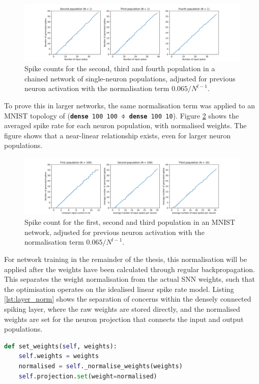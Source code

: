 \begin{figure}
  \includegraphics[width=\linewidth]{images/spike_rate_chain.png}
  \caption{Spike counts for the second, third and fourth population in a chained network of
  single-neuron populations, adjusted for previous neuron activation with the
  normalisation term $0.065 / N^{l - 1}$.}
  \label{fig:spike_rates_chain}
\end{figure}

To prove this in larger networks, the same normalisation term was applied to an MNIST
topology of (\texttt{\textbf{dense} 100 100 $\obar$ \textbf{dense} 100 10}).
Figure \ref{fig:spike_rates_mnist} shows the averaged spike rate for each neuron
population, with normalised weights.
The figure shows that a near-linear relationship exists, even for larger neuron populations.

\begin{figure}
  \includegraphics[width=\linewidth]{images/spike_rate_mnist.png}
  \caption{Spike count for the first, second and third population in an MNIST
    network, adjusted for previous neuron activation with the
  normalisation term $0.065 / N^{l - 1}$.}
  \label{fig:spike_rates_mnist}
\end{figure}

For network training in the remainder of the thesis, this normalisation will
be applied after the weights have been calculated through regular backpropagation. 
This separates the weight normalisation from the actual \gls{SNN} weights, such
that the optimisation operates on the idealised linear spike rate model.
Listing \ref{lst:layer_norm} shows the separation of concerns within the densely
connected spiking layer, where the raw weights are stored directly, and the normalised
weights are set for the neuron projection that connects the input and output
populations.

\begin{lstlisting}[language=Python,label={lst:layer_norm},caption={Weight
normalisation in the spiking dense layer.}]
def set_weights(self, weights): 
    self.weights = weights
    normalised = self._normalise_weights(weights)
    self.projection.set(weight=normalised)   
\end{lstlisting}

